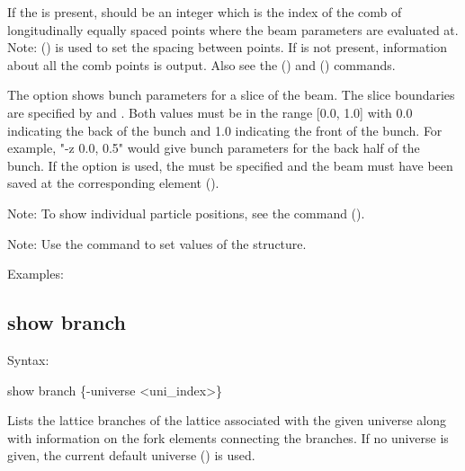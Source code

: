 {{{{{{{{If the  is present,  should be an integer which is the index of the comb
of longitudinally equally spaced points where the beam parameters are evaluated at.  Note:
 () is used to set the spacing between points.  If
 is not present, information about all the comb points is output. Also see the
 () and  ()
commands.

The  option shows bunch parameters for a slice of the beam. The slice boundaries
are specified by  and . Both values must be in the range [0.0, 1.0] with 0.0
indicating the back of the bunch and 1.0 indicating the front of the bunch. For example, "-z 0.0,
0.5" would give bunch parameters for the back half of the bunch. If the  option is used,
the  must be specified and the beam must have been saved at the corresponding
element ().

Note: To show individual particle positions, see the  command
().

Note: Use the  command to set values of the  structure.

Examples:


\subsection{show branch}
\label{s:show.branch}

Syntax:
\begin{example}
  show branch \{-universe <uni_index>\}
\end{example}

Lists the lattice branches of the lattice associated with the given universe along with information
on the fork elements connecting the branches.  If no universe is given, the current default universe
() is used.

}}}}}}}}

